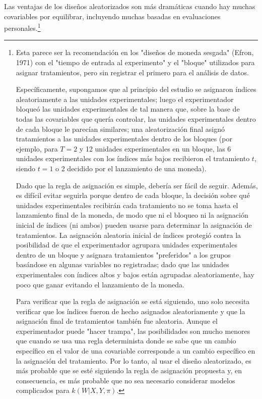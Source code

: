 \documentclass[12pt,a4paper]{article}
\begin{document}
Las ventajas de los diseños aleatorizados son más dramáticas cuando hay muchas covariables por equilibrar, incluyendo muchas basadas en evaluaciones personales.\footnote{Esta parece ser la recomendación en los "diseños de moneda sesgada" (Efron, 1971) con el "tiempo de entrada al experimento" y el "bloque" utilizados para asignar tratamientos, pero sin registrar el primero para el análisis de datos. 

Específicamente, supongamos que al principio del estudio se asignaron índices aleatoriamente a las unidades experimentales;  luego el experimentador bloqueó las unidades experimentales de tal manera que, sobre la base de todas las covariables que quería controlar, las unidades experimentales dentro de cada bloque le parecían similares; una aleatorización final asignó tratamientos a las unidades experimentales dentro de los bloques (por ejemplo, para $T=2$ y 12 unidades experimentales en un bloque, las 6 unidades experimentales con los índices más bajos recibieron el tratamiento $t$, siendo $t=1$ o 2 decidido por el lanzamiento de una moneda). 

Dado que la regla de asignación es simple, debería ser fácil de seguir. Además, es difícil evitar seguirla porque dentro de cada bloque, la decisión sobre qué unidades experimentales recibirán cada tratamiento no se toma hasta el lanzamiento final de la moneda, de modo que ni el bloqueo ni la asignación inicial de índices (ni ambos) pueden usarse para determinar la asignación de tratamientos. La asignación aleatoria inicial de índices protegió contra la posibilidad de que el experimentador agrupara unidades experimentales dentro de un bloque y asignara tratamientos "preferidos" a los grupos basándose en algunas variables no registradas; dado que las unidades experimentales con índices altos y bajos están agrupadas aleatoriamente, hay poco que ganar evitando el lanzamiento de la moneda. 

Para verificar que la regla de asignación se está siguiendo, uno solo necesita verificar que los índices fueron de hecho asignados aleatoriamente y que la asignación final de tratamientos también fue aleatoria. Aunque el experimentador puede "hacer trampa", las posibilidades son mucho menores que cuando se usa una regla determinista donde se sabe que un cambio específico en el valor de una covariable corresponde a un cambio específico en la asignación del tratamiento. Por lo tanto, al usar el diseño aleatorizado, es más probable que se esté siguiendo la regla de asignación propuesta y, en consecuencia, es más probable que no sea necesario considerar modelos complicados para $k(W|X,Y,\pi)$.

}
\end{document}
